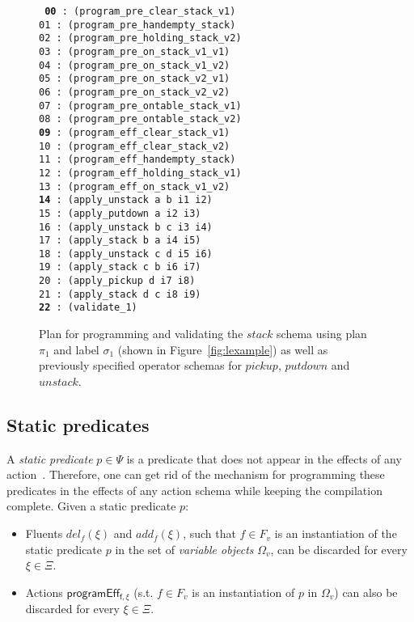 \documentclass[letterpaper]{article} %
\begin{document}
\begin{figure}
{\footnotesize\tt
     {\bf 00} : (program\_pre\_clear\_stack\_v1)\\
     01 : (program\_pre\_handempty\_stack)\\
     02 : (program\_pre\_holding\_stack\_v2)\\
     03 : (program\_pre\_on\_stack\_v1\_v1)\\
     04 : (program\_pre\_on\_stack\_v1\_v2)\\
     05 : (program\_pre\_on\_stack\_v2\_v1)\\
     06 : (program\_pre\_on\_stack\_v2\_v2)\\
     07 : (program\_pre\_ontable\_stack\_v1)\\
     08 : (program\_pre\_ontable\_stack\_v2)\\
     {\bf 09} : (program\_eff\_clear\_stack\_v1)\\
    10 : (program\_eff\_clear\_stack\_v2)\\
    11 : (program\_eff\_handempty\_stack)\\
    12 : (program\_eff\_holding\_stack\_v1)\\
    13 : (program\_eff\_on\_stack\_v1\_v2)\\
    {\bf 14} : (apply\_unstack a b i1 i2)\\
    15 : (apply\_putdown a i2 i3)\\
    16 : (apply\_unstack b c i3 i4)\\
    17 : (apply\_stack b a i4 i5)\\
    18 : (apply\_unstack c d i5 i6)\\
    19 : (apply\_stack c b i6 i7)\\
    20 : (apply\_pickup d i7 i8)\\
    21 : (apply\_stack d c i8 i9)\\
    {\bf 22} : (validate\_1)
}
 \caption{\small Plan for programming and validating the $stack$ schema using plan $\pi_1$ and label $\sigma_1$ (shown in Figure~\ref{fig:lexample}) as well as previously specified operator schemas for $pickup$, $putdown$ and $unstack$.}
\label{fig:plan}
\end{figure}


\subsection{Static predicates}
A {\em static predicate} $p \in \Psi$ is a predicate that does not appear in the effects of any action~\cite{fox:TIM:JAIR1998}. Therefore, one can get rid of the mechanism for programming these predicates in the effects of any action schema while keeping the compilation complete. Given a static predicate $p$:
\begin{itemize}
\item Fluents $del_f(\xi)$ and $add_f(\xi)$, such that $f\in F_v$ is an instantiation of the static predicate $p$ in the set of {\em variable objects} $\Omega_v$, can be discarded for every $\xi\in\Xi$.
\item Actions $\mathsf{programEff_{f,\xi}}$ (s.t. $f\in F_v$ is an instantiation of $p$ in $\Omega_v$) can also be discarded for every $\xi\in\Xi$.
\end{itemize}
\end{document}
